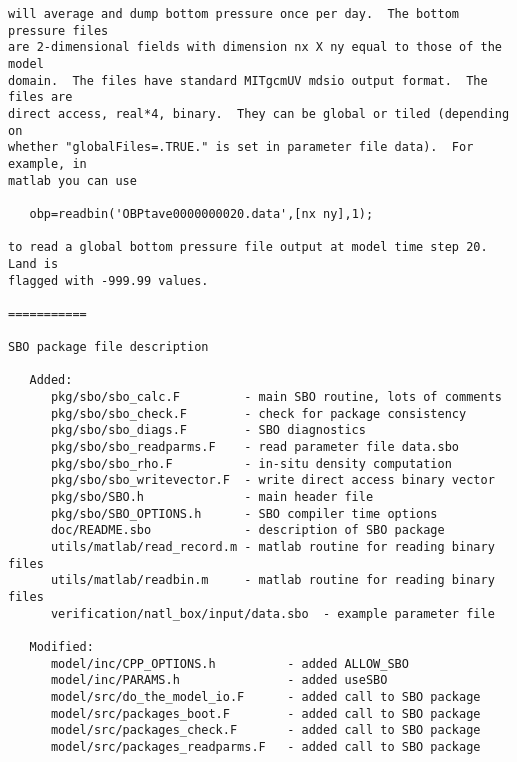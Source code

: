 \begin{verbatim}
will average and dump bottom pressure once per day.  The bottom pressure files
are 2-dimensional fields with dimension nx X ny equal to those of the model
domain.  The files have standard MITgcmUV mdsio output format.  The files are
direct access, real*4, binary.  They can be global or tiled (depending on
whether "globalFiles=.TRUE." is set in parameter file data).  For example, in
matlab you can use

   obp=readbin('OBPtave0000000020.data',[nx ny],1);

to read a global bottom pressure file output at model time step 20.  Land is
flagged with -999.99 values.

===========

SBO package file description

   Added:
      pkg/sbo/sbo_calc.F         - main SBO routine, lots of comments
      pkg/sbo/sbo_check.F        - check for package consistency
      pkg/sbo/sbo_diags.F        - SBO diagnostics
      pkg/sbo/sbo_readparms.F    - read parameter file data.sbo
      pkg/sbo/sbo_rho.F          - in-situ density computation
      pkg/sbo/sbo_writevector.F  - write direct access binary vector
      pkg/sbo/SBO.h              - main header file
      pkg/sbo/SBO_OPTIONS.h      - SBO compiler time options
      doc/README.sbo             - description of SBO package
      utils/matlab/read_record.m - matlab routine for reading binary files
      utils/matlab/readbin.m     - matlab routine for reading binary files
      verification/natl_box/input/data.sbo  - example parameter file

   Modified:
      model/inc/CPP_OPTIONS.h          - added ALLOW_SBO
      model/inc/PARAMS.h               - added useSBO
      model/src/do_the_model_io.F      - added call to SBO package
      model/src/packages_boot.F        - added call to SBO package
      model/src/packages_check.F       - added call to SBO package
      model/src/packages_readparms.F   - added call to SBO package
\end{verbatim}
